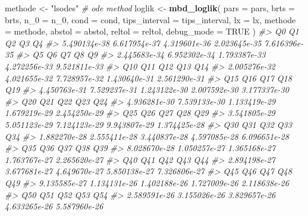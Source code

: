 \documentclass[]{article}
\newenvironment{Shaded}{\begin{snugshade}}{\end{snugshade}}
\newcommand{\CommentTok}[1]{\textcolor[rgb]{0.56,0.35,0.01}{\textit{#1}}}
\newcommand{\DataTypeTok}[1]{\textcolor[rgb]{0.13,0.29,0.53}{#1}}
\newcommand{\DecValTok}[1]{\textcolor[rgb]{0.00,0.00,0.81}{#1}}
\newcommand{\KeywordTok}[1]{\textcolor[rgb]{0.13,0.29,0.53}{\textbf{#1}}}
\newcommand{\NormalTok}[1]{#1}
\newcommand{\OtherTok}[1]{\textcolor[rgb]{0.56,0.35,0.01}{#1}}
\newcommand{\StringTok}[1]{\textcolor[rgb]{0.31,0.60,0.02}{#1}}
\begin{document}
\begin{Shaded}
\begin{Highlighting}[]
\NormalTok{methode <-}\StringTok{ "lsodes"} \CommentTok{# ode method}
\NormalTok{loglik <-}\StringTok{ }\KeywordTok{mbd_loglik}\NormalTok{(}
  \DataTypeTok{pars =}\NormalTok{ pars,}
  \DataTypeTok{brts =}\NormalTok{ brts,}
  \DataTypeTok{n_0 =}\NormalTok{ n_}\DecValTok{0}\NormalTok{,}
  \DataTypeTok{cond =}\NormalTok{ cond,}
  \DataTypeTok{tips_interval =}\NormalTok{ tips_interval,}
  \DataTypeTok{lx =}\NormalTok{ lx,}
  \DataTypeTok{methode =}\NormalTok{ methode,}
  \DataTypeTok{abstol =}\NormalTok{ abstol,}
  \DataTypeTok{reltol =}\NormalTok{ reltol,}
  \DataTypeTok{debug_mode =} \OtherTok{TRUE}
\NormalTok{)}
\CommentTok{#>            Q0            Q1            Q2            Q3            Q4 }
\CommentTok{#>  5.490134e-38  6.617954e-37  4.319601e-36  2.023645e-35  7.616396e-35 }
\CommentTok{#>            Q5            Q6            Q7            Q8            Q9 }
\CommentTok{#>  2.445683e-34  6.952302e-34  1.793387e-33  4.272256e-33  9.521811e-33 }
\CommentTok{#>           Q10           Q11           Q12           Q13           Q14 }
\CommentTok{#>  2.005276e-32  4.021655e-32  7.728957e-32  1.430640e-31  2.561290e-31 }
\CommentTok{#>           Q15           Q16           Q17           Q18           Q19 }
\CommentTok{#>  4.450763e-31  7.529237e-31  1.243122e-30  2.007592e-30  3.177337e-30 }
\CommentTok{#>           Q20           Q21           Q22           Q23           Q24 }
\CommentTok{#>  4.936281e-30  7.539133e-30  1.133419e-29  1.679219e-29  2.454250e-29 }
\CommentTok{#>           Q25           Q26           Q27           Q28           Q29 }
\CommentTok{#>  3.541805e-29  5.051123e-29  7.124123e-29  9.943807e-29  1.374425e-28 }
\CommentTok{#>           Q30           Q31           Q32           Q33           Q34 }
\CommentTok{#>  1.882270e-28  2.555411e-28  3.440837e-28  4.597085e-28  6.096651e-28 }
\CommentTok{#>           Q35           Q36           Q37           Q38           Q39 }
\CommentTok{#>  8.028670e-28  1.050257e-27  1.365168e-27  1.763767e-27  2.265620e-27 }
\CommentTok{#>           Q40           Q41           Q42           Q43           Q44 }
\CommentTok{#>  2.894198e-27  3.677681e-27  4.649670e-27  5.850138e-27  7.326806e-27 }
\CommentTok{#>           Q45           Q46           Q47           Q48           Q49 }
\CommentTok{#>  9.135585e-27  1.134131e-26  1.402188e-26  1.727009e-26  2.118638e-26 }
\CommentTok{#>           Q50           Q51           Q52           Q53           Q54 }
\CommentTok{#>  2.589591e-26  3.155026e-26  3.829657e-26  4.633265e-26  5.587960e-26 }

\end{Highlighting}
\end{Shaded}
\end{document}
